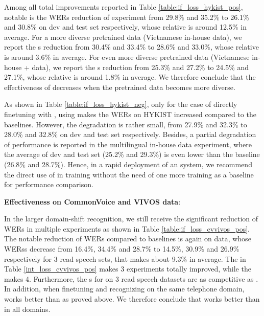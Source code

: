 Among all total improvements reported in Table \ref{table:if_loss_hykist_pos}, notable is the \Glspl{WER} reduction of  experiment from 29.8\% and 35.2\% to 26.1\% and 30.8\% on dev and test set respectively, whose relative  is around 12.5\% in average.
For a more diverse pretrained data (Vietnamese in-house data), we report the s reduction from 30.4\% and 33.4\% to 28.6\% and 33.0\%, whose relative  is around 3.6\% in average.
For even more diverse pretrained data (Vietnamese in-house  +  data), we report the s reduction from 25.3\% and 27.2\% to 24.5\% and 27.1\%, whose relative  is around 1.8\% in average.
We therefore conclude that the effectiveness of  decreases when the pretrained data becomes more diverse.




As shown in Table \ref{table:if_loss_hykist_neg}, only for the case of directly finetuning with , using  makes the \Glspl{WER} on HYKIST increased compared to the baselines. 
However, the degradation is rather small, from 27.9\% and 32.3\% to 28.0\% and 32.8\% on dev and test set respectively.
Besides, a partial degradation of performance is reported in the multilingual in-house data experiment, where the  average  of dev and test set (25.2\% and 29.3\%) is even lower than the baseline (26.8\% and 28.7\%).
Hence, in a rapid deployment of an  system, we recommend the direct use of  in training without the need of one more training as a baseline for performance comparison.



\bigskip

\textbf{Effectiveness on CommonVoice and VIVOS data}: 

In the larger domain-shift recognition, we still receive the significant reduction of \Glspl{WER} in multiple experiments as shown in Table \ref{table:if_loss_cvvivos_pos}. 
The notable reduction of \Glspl{WER} compared to baselines is again on  data, whose \Glspl{WER}s decrease from 16.4\%, 34.4\% and 28.7\% to 14.5\%, 30.9\% and 26.9\% respectively for 3 read speech sets, that makes  about 9.3\% in average.
The  in Table \ref{int_loss_cvvivos_pos} makes 3 experiments totally improved, while the  makes 4. 
Furthermore, the s for  on 3 read speech datasets are as competitive as .
In addition, when finetuning and recognizing on the same telephone domain,  works better than  as proved above.
We therefore conclude that  works better than  in all domains.

